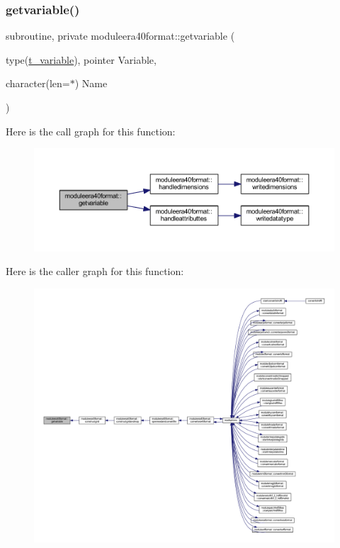 \subsubsection{\texorpdfstring{getvariable()}{getvariable()}}
{\footnotesize\ttfamily subroutine, private moduleera40format\+::getvariable (\begin{DoxyParamCaption}\item[{type(\mbox{\hyperlink{structmoduleera40format_1_1t__variable}{t\+\_\+variable}}), pointer}]{Variable,  }\item[{character(len=$\ast$)}]{Name }\end{DoxyParamCaption})\hspace{0.3cm}{\ttfamily [private]}}

Here is the call graph for this function\+:\nopagebreak
\begin{figure}[H]
\begin{center}
\leavevmode
\includegraphics[width=350pt]{namespacemoduleera40format_ad2e0367ac675a7a629eb4baf66bcf7c6_cgraph}
\end{center}
\end{figure}
Here is the caller graph for this function\+:\nopagebreak
\begin{figure}[H]
\begin{center}
\leavevmode
\includegraphics[width=350pt]{namespacemoduleera40format_ad2e0367ac675a7a629eb4baf66bcf7c6_icgraph}
\end{center}
\end{figure}
\mbox{\label{namespacemoduleera40format_adaf25cab272ca9c6e2db6b1f641c0136}} 
